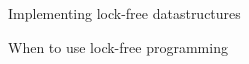 \begin{frame}{Implementing lock-free datastructures}

\end{frame}

\begin{frame}{When to use lock-free programming}

\end{frame}
